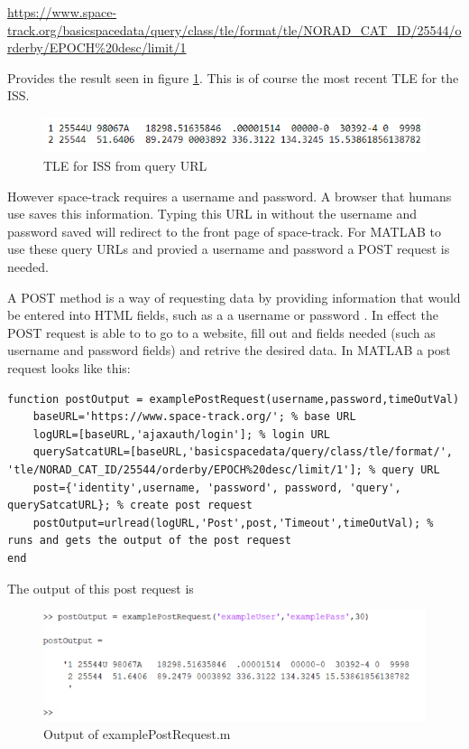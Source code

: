 \documentclass[12pt]{article}
\begin{document}
\url{https://www.space-track.org/basicspacedata/query/class/tle/format/tle/NORAD_CAT_ID/25544/orderby/EPOCH%20desc/limit/1}
	
	Provides the result seen in figure \ref{fig:isstle}. This is of course the most recent TLE for the ISS.
	
	\begin{figure}[H]
		\centering
		\includegraphics[width=0.7\linewidth]{ISS_tle}
		\caption{TLE for ISS from query URL}
		\label{fig:isstle}
	\end{figure}

However space-track requires a username and password. A browser that humans use saves this information. Typing this URL in without the username and password saved will redirect to the front page of space-track. For MATLAB to use these query URLs and provied a username and password a POST request is needed. \par 

A POST method is a way of requesting data by providing information that would be entered into HTML fields, such as a a username or password \cite{postRef}. In effect the POST request is able to to go to a website, fill out and fields needed (such as username and password fields) and retrive the desired data. In MATLAB a post request looks like this:	
	
\singlespacing
\begin{lstlisting}
function postOutput = examplePostRequest(username,password,timeOutVal)
	baseURL='https://www.space-track.org/'; % base URL
	logURL=[baseURL,'ajaxauth/login']; % login URL
	querySatcatURL=[baseURL,'basicspacedata/query/class/tle/format/', 'tle/NORAD_CAT_ID/25544/orderby/EPOCH%20desc/limit/1']; % query URL
	post={'identity',username, 'password', password, 'query', querySatcatURL}; % create post request
	postOutput=urlread(logURL,'Post',post,'Timeout',timeOutVal); % runs and gets the output of the post request
end 
\end{lstlisting}
\doublespacing
The output of this post request is 

\begin{figure}[H]
	\centering
	\includegraphics[width=0.7\linewidth]{ISS_tle_Post}
	\caption{Output of examplePostRequest.m}
	\label{fig:isstlepost}
\end{figure}
\end{document}
